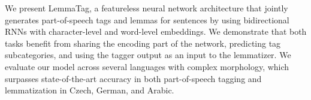 We present LemmaTag, a featureless neural network architecture that jointly generates part-of-speech tags and lemmas for sentences by using bidirectional RNNs with character-level and word-level embeddings. We demonstrate that both tasks benefit from sharing the encoding part of the network, predicting tag subcategories, and using the tagger output as an input to the lemmatizer. We evaluate our model across several languages with complex morphology, which surpasses state-of-the-art accuracy in both part-of-speech tagging and lemmatization in Czech, German, and Arabic.

